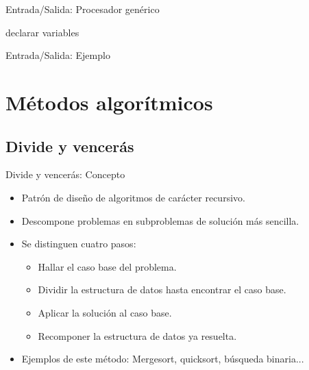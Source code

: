 \documentclass[10pt]{beamer}
\begin{document}
\begin{frame}{Entrada/Salida: Procesador genérico}
  \begin{algorithm}[H]
    declarar variables\;
  \end{algorithm}
\end{frame}

\begin{frame}{Entrada/Salida: Ejemplo}
  \lstES
\end{frame}
\section{Métodos algorítmicos}

\subsection{Divide y vencerás}
\begin{frame}{Divide y vencerás: Concepto}
  \begin{itemize}
  \item Patrón de diseño de algoritmos de carácter recursivo. \pause
  \item Descompone problemas en subproblemas de solución más sencilla. \pause
  \item Se distinguen cuatro pasos: \pause
    \begin{itemize}
    \item Hallar el caso base del problema. \pause
    \item Dividir la estructura de datos hasta encontrar el caso base. \pause
    \item Aplicar la solución al caso base. \pause
    \item Recomponer la estructura de datos ya resuelta. \pause
    \end{itemize}
  \item Ejemplos de este método: Mergesort, quicksort, búsqueda binaria...
  \end{itemize}
\end{frame}
\end{document}
